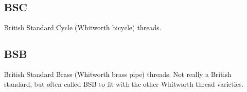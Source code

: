 

\subsection{BSC}
British Standard Cycle (Whitworth bicycle) threads.
\clearpage

\subsection{BSB}
British Standard Brass (Whitworth brass pipe) threads.  Not really a British standard, but often called BSB to fit with the other Whitworth thread varieties.
\clearpage

